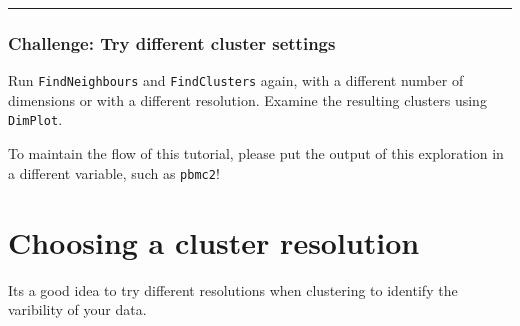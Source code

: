 \documentclass[
]{book}
\begin{document}
\begin{center}\rule{0.5\linewidth}{0.5pt}\end{center}

\hypertarget{challenge-try-different-cluster-settings}{%
\subsubsection*{Challenge: Try different cluster settings}\label{challenge-try-different-cluster-settings}}

Run \texttt{FindNeighbours} and \texttt{FindClusters} again, with a different number of dimensions or with a different resolution. Examine the resulting clusters using \texttt{DimPlot}.

To maintain the flow of this tutorial, please put the output of this exploration in a different variable, such as \texttt{pbmc2}!

\hypertarget{section-9}{%
\subsubsection*{}\label{section-9}}

\hypertarget{choosing-a-cluster-resolution}{%
\section{Choosing a cluster resolution}\label{choosing-a-cluster-resolution}}

Its a good idea to try different resolutions when clustering to identify the varibility of your data.
\end{document}
